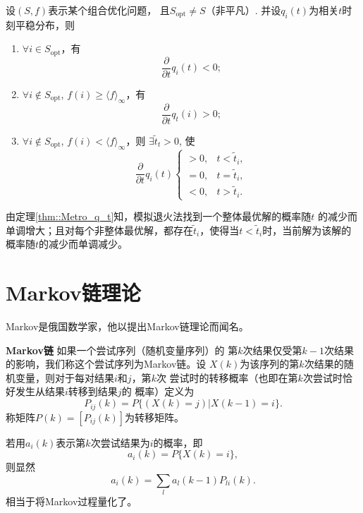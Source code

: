 \begin{theorem}{} 设$(S, f)$表示某个组合优化问题，
  且$S_{\mathrm{opt}} \neq S$（非平凡）. 并设$q_i(t)$为相关$t$时刻平稳分布，则
  \begin{enumerate}
  \item $\forall i \in S_{\mathrm{opt}}$，有
    \begin{equation}
      \frac{\partial}{\partial t}q_i(t) < 0;
    \end{equation}
  \item $\forall i \notin S_{\mathrm{opt}}$, $f(i) \geq \langle f\rangle_\infty$，有
    \begin{equation}
      \frac{\partial}{\partial t} q_t(i) > 0;
    \end{equation}
  \item $\forall i \notin S_{\mathrm{opt}}$, $f(i) < \langle f\rangle_\infty$，则
    $\exists \tilde{t}_t > 0$, 使
    \begin{equation}
      \frac{\partial}{\partial t} q_i(t) \left\{
      \begin{array}{ll}
        > 0, & t < \tilde{t}_i, \\
        = 0, & t = \tilde{t}_i, \\
        < 0, & t > \tilde{t}_i.
      \end{array}
      \right.
    \end{equation}
  \end{enumerate}
  \label{thm::Metro_q_t}
\end{theorem}

由定理\ref{thm::Metro_q_t}知，模拟退火法找到一个整体最优解的概率随$t$
的减少而单调增大；且对每个非整体最优解，都存在$\tilde{t}_i$，使得当$t
< \tilde{t}_i$时，当前解为该解的概率随$t$的减少而单调减少。

\section{Markov链理论}

Markov是俄国数学家，他以提出Markov链理论而闻名。

\begin{definition}{\hei \bf Markov链} 如果一个尝试序列（随机变量序列）的
  第$k$次结果仅受第$k - 1$次结果的影响，我们称这个尝试序列为Markov链。设
  $X(k)$为该序列的第$k$次结果的随机变量，则对于每对结果$i$和$j$，第$k$次
  尝试时的转移概率（也即在第$k$次尝试时恰好发生从结果$i$转移到结果$j$的
    概率）定义为
  \begin{equation}
    P_{ij}(k) = P\{(X(k) = j) | X(k - 1) = i\}.
  \end{equation}
  称矩阵$P(k) = [P_{ij}(k)]$为转移矩阵。
\end{definition}
若用$a_i(k)$表示第$k$次尝试结果为$i$的概率，即
\begin{equation}
  a_i(k) = P\{X(k) = i\},
\end{equation}
则显然
\begin{equation}
  a_i(k) = \sum_{l} a_l(k - 1)P_{li}(k).
\end{equation}
相当于将Markov过程量化了。

